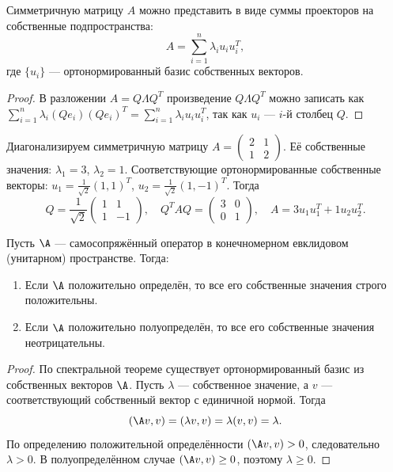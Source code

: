 \documentclass[10pt]{article}
\begin{document}
\begin{corollary}
    Симметричную матрицу $A$ можно представить в виде суммы проекторов на собственные подпространства:
    \[
    A = \sum_{i=1}^n \lambda_i u_i u_i^T,
    \]
    где $\{u_i\}$ — ортонормированный базис собственных векторов.
\end{corollary}
\begin{proof}
    В разложении $A = Q \Lambda Q^T$ произведение $Q \Lambda Q^T$ можно записать как $\sum_{i=1}^n \lambda_i (Q e_i)(Q e_i)^T = \sum_{i=1}^n \lambda_i u_i u_i^T$, так как $u_i$ — $i$-й столбец $Q$.
\end{proof}

\begin{example}
    Диагонализируем симметричную матрицу $A = \begin{pmatrix} 2 & 1 \\ 1 & 2 \end{pmatrix}$. Её собственные значения: $\lambda_1 = 3$, $\lambda_2 = 1$. Соответствующие ортонормированные собственные векторы: $u_1 = \frac{1}{\sqrt{2}}(1,1)^T$, $u_2 = \frac{1}{\sqrt{2}}(1,-1)^T$. Тогда
    \[
    Q = \frac{1}{\sqrt{2}}\begin{pmatrix} 1 & 1 \\ 1 & -1 \end{pmatrix},\quad Q^T A Q = \begin{pmatrix} 3 & 0 \\ 0 & 1 \end{pmatrix},\quad A = 3u_1u_1^T + 1u_2u_2^T.
    \]
\end{example}


\begin{theorem}
    Пусть $\A$ — самосопряжённый оператор в конечномерном евклидовом (унитарном) пространстве. Тогда:
    \begin{enumerate}
        \item Если $\A$ положительно определён, то все его собственные значения строго положительны.
        \item Если $\A$ положительно полуопределён, то все его собственные значения неотрицательны.
    \end{enumerate}
\end{theorem}

\begin{proof}
    По спектральной теореме существует ортонормированный базис из собственных векторов $\A$. Пусть $\lambda$ — собственное значение, а $v$ — соответствующий собственный вектор с единичной нормой. Тогда
    \[
    (\A v, v) = (\lambda v, v) = \lambda (v, v) = \lambda.
    \]
    По определению положительной определённости $(\A v, v) > 0$, следовательно $\lambda > 0$. В полуопределённом случае $(\A v, v) \ge 0$, поэтому $\lambda \ge 0$.
\end{proof}
\end{document}
